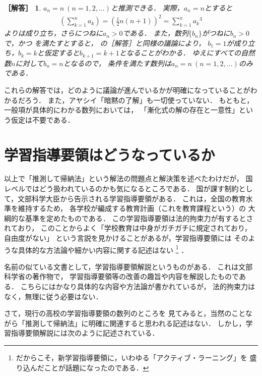 \documentclass[11pt,a4paper]{ltjsarticle} %
\theoremstyle{mystyle} %
\newtheorem*{ans}{［解答］} %
\begin{document}
\begin{ans}
  $a_n = n \ (n= 1,2, \ldots)$と推測できる．
  実際，$a_n = n$とすると
  \begin{align*}
    \left( \sum_{k=1}^{n} a_k \right) = \left( \frac{1}{2} n(n+1) \right) ^2
    = \sum_{k=1}^{n} {a_k}^3
  \end{align*}
  よりは成り立ち，さらにつねに$a_n > 0$である．
  また，数列$\{ b_n \}$がつねに$b_n > 0$で，かつ
  を満たすとすると，
  の［解答］と同様の議論により，
  $b_1=1$が成り立ち，$b_k=k$と仮定すると$b_{k+1} = k+1$となることがわかる．
  ゆえにすべての自然数$n$に対して$b_n=n$となるので，
  条件を満たす数列は$a_n = n \ (n=1,2,\ldots)$のみである．
\end{ans}

これらの解答では，どのように議論が進んでいるかが明確になっていることがわかるだろう．
また，アヤシイ「暗黙の了解」も一切使っていない．
もともと，一般項が具体的にわかる数列においては，
「漸化式の解の存在と一意性」という仮定は不要である．




\section{学習指導要領はどうなっているか}
以上で「推測して帰納法」という解法の問題点と解決策を述べたわけだが，
国レベルではどう扱われているのかも気になるところである．
国が課す制約として，文部科学大臣から告示される学習指導要領がある．
これは，全国の教育水準を維持するため，
各学校が編成する教育計画（これを教育課程という）の
大綱的な基準を定めたものである\cite{monkasyo}．
この学習指導要領は法的拘束力が有するとされており，
このことからよく「学校教育は中身がガチガチに規定されており，自由度がない」
という言説を見かけることがあるが，学習指導要領には
そのような具体的な方法論や細かい内容に関する記述はない
\footnote{
  だからこそ，新学習指導要領に，いわゆる「アクティブ・ラーニング」を
  盛り込んだことが話題になったのである．
}
．

名前の似ている文書として，学習指導要領解説というものがある．
これは文部科学省の著作物で，
学習指導要領等の改善の趣旨や内容を解説したものである\cite{monkasyo}．
こちらにはかなり具体的な内容や方法論が書かれているが，
法的拘束力はなく，無理に従う必要はない．


さて，現行の高校の学習指導要領\cite{youryou}の数列のところを
見てみると，当然のことながら「推測して帰納法」に明確に関連すると思われる記述はない．
しかし，学習指導要領解説\cite{youryoukai}には次のように記述されている．
\end{document}
